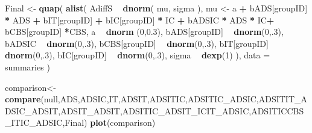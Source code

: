 \documentclass[10pt,dvipsnames,enabledeprecatedfontcommands]{scrartcl}
\newenvironment{Shaded}{\begin{snugshade}}{\end{snugshade}}
\newcommand{\KeywordTok}[1]{\textcolor[rgb]{0.13,0.29,0.53}{\textbf{#1}}}
\newcommand{\DataTypeTok}[1]{\textcolor[rgb]{0.13,0.29,0.53}{#1}}
\newcommand{\DecValTok}[1]{\textcolor[rgb]{0.00,0.00,0.81}{#1}}
\newcommand{\FloatTok}[1]{\textcolor[rgb]{0.00,0.00,0.81}{#1}}
\newcommand{\StringTok}[1]{\textcolor[rgb]{0.31,0.60,0.02}{#1}}
\newcommand{\OperatorTok}[1]{\textcolor[rgb]{0.81,0.36,0.00}{\textbf{#1}}}
\newcommand{\NormalTok}[1]{#1}
\begin{document}
\begin{Shaded}
\begin{Highlighting}[]
\NormalTok{Final <-}\StringTok{ }\KeywordTok{quap}\NormalTok{(}
  \KeywordTok{alist}\NormalTok{(}
\NormalTok{    AdiffS }\OperatorTok{~}\StringTok{ }\KeywordTok{dnorm}\NormalTok{( mu, sigma ),}
\NormalTok{    mu <-}\StringTok{ }\NormalTok{a }\OperatorTok{+}\StringTok{ }\NormalTok{bADS[groupID] }\OperatorTok{*}\StringTok{ }\NormalTok{ADS }\OperatorTok{+}\StringTok{  }\NormalTok{bIT[groupID] }\OperatorTok{+}\StringTok{ }\NormalTok{bIC[groupID] }\OperatorTok{*}\StringTok{ }\NormalTok{IC }\OperatorTok{+}\StringTok{ }
\StringTok{      }\NormalTok{bADSIC }\OperatorTok{*}\StringTok{ }\NormalTok{ADS }\OperatorTok{*}\StringTok{ }\NormalTok{IC}\OperatorTok{+}\StringTok{ }\NormalTok{bCBS[groupID] }\OperatorTok{*}\NormalTok{CBS,}
\NormalTok{    a }\OperatorTok{~}\StringTok{ }\KeywordTok{dnorm}\NormalTok{ (}\DecValTok{0}\NormalTok{,}\FloatTok{0.3}\NormalTok{),}
\NormalTok{    bADS[groupID] }\OperatorTok{~}\StringTok{ }\KeywordTok{dnorm}\NormalTok{(}\DecValTok{0}\NormalTok{,.}\DecValTok{3}\NormalTok{),}
\NormalTok{    bADSIC }\OperatorTok{~}\StringTok{ }\KeywordTok{dnorm}\NormalTok{(}\DecValTok{0}\NormalTok{,.}\DecValTok{3}\NormalTok{),}
\NormalTok{    bCBS[groupID] }\OperatorTok{~}\StringTok{ }\KeywordTok{dnorm}\NormalTok{(}\DecValTok{0}\NormalTok{,.}\DecValTok{3}\NormalTok{),}
\NormalTok{    bIT[groupID] }\OperatorTok{~}\StringTok{ }\KeywordTok{dnorm}\NormalTok{(}\DecValTok{0}\NormalTok{,.}\DecValTok{3}\NormalTok{),}
\NormalTok{    bIC[groupID] }\OperatorTok{~}\StringTok{ }\KeywordTok{dnorm}\NormalTok{(}\DecValTok{0}\NormalTok{,.}\DecValTok{3}\NormalTok{),}
\NormalTok{    sigma  }\OperatorTok{~}\StringTok{ }\KeywordTok{dexp}\NormalTok{(}\DecValTok{1}\NormalTok{)}
\NormalTok{  ), }
  \DataTypeTok{data =}\NormalTok{ summaries}
\NormalTok{)}
\end{Highlighting}
\end{Shaded}

\normalsize

\vspace{1mm} \footnotesize

\begin{Shaded}
\begin{Highlighting}[]
\NormalTok{comparison<-}\StringTok{ }\KeywordTok{compare}\NormalTok{(null,ADS,ADSIC,IT,ADSIT,ADSITIC,ADSITIC_ADSIC,ADSITIT_ADSIC_ADSIT,ADSIT_ADSIT,ADSITIC_ADSIT_ICIT_ADSIC,ADSITICCBS_ITIC_ADSIC,Final)}
\KeywordTok{plot}\NormalTok{(comparison)}
\end{Highlighting}
\end{Shaded}
\end{document}
